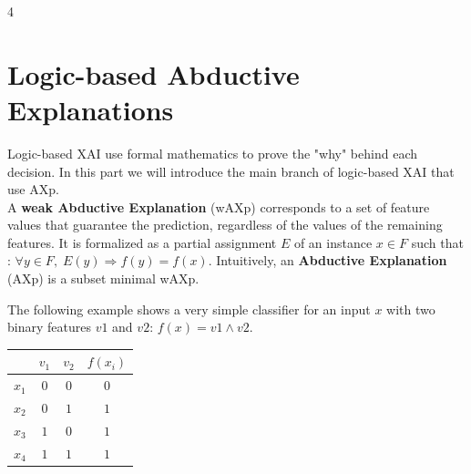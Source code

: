\documentclass[a0,landscape]{a0poster}
\begin{document}
\begin{multicols}{4}
\color{Black}

\section{Logic-based Abductive Explanations}

\color{DarkSlateGray}



Logic-based XAI use formal mathematics to prove the "why" behind each decision. In this part we will introduce the main branch of logic-based XAI that use AXp. \\

A \textbf{weak Abductive Explanation} (wAXp) corresponds to a set of feature values that guarantee the prediction, regardless of the values of the remaining features. It is formalized as a partial assignment $E$ of an instance $x \in F$ such that : $\forall y \in F,\; E(y) \Rightarrow f(y) = f(x)$. Intuitively, an \textbf{Abductive Explanation} (AXp) is a subset minimal wAXp.

The following example shows a very simple classifier for an input $x$ with two binary features $v1$ and $v2$: $f(x) = v1 \land v2$.

\begin{center}
    \begin{tabular}{|c|cc|c|}
    \hline
    & $v_1$ & $v_2$ & $f(x_i)$ \\
    \hline
    \rowcolor{red!15} %
    $x_1$ & $\mathit{0}$ & $\mathit{0}$ & $\mathit{0}$ \\
    $x_2$ & $\mathit{0}$ & $\mathit{1}$ & $\mathit{1}$ \\
    $x_3$ & $\mathit{1}$ & $\mathit{0}$ & $\mathit{1}$ \\
    \rowcolor{red!15}
    $x_4$ & $\mathit{1}$ & $\mathit{1}$ & $\mathit{1}$ \\
    \hline
    \end{tabular}
\end{center}


\end{multicols}
\end{document}
